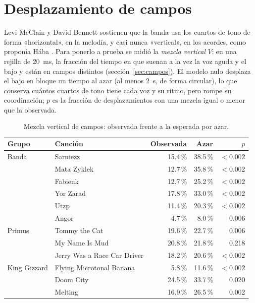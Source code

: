 \section{Desplazamiento de campos}\label{sec:res-haba}

Levi McClain y David Bennett sostienen que la banda usa los cuartos de tono de forma «horizontal», en la melodía, y casi
nunca «vertical», en los acordes, como proponía Hába \citep{mcclain2026,bennett2026}. Para ponerlo a prueba se midió la
\emph{mezcla vertical} $V$: en una rejilla de 20~ms, la fracción del tiempo en que suenan a la vez la voz aguda y el bajo
y están en campos distintos (sección~\ref{sec:campos}). El modelo nulo desplaza el bajo en bloque un tiempo al azar (al
menos 2~s, de forma circular), lo que conserva cuántos cuartos de tono tiene cada voz y su ritmo, pero rompe su
coordinación; $p$ es la fracción de desplazamientos con una mezcla igual o menor que la observada.

\begin{table}[ht]
  \centering
  \caption{Mezcla vertical de campos: observada frente a la esperada por azar.}\label{tab:haba}
  \begin{tabular}{@{}llrrr@{}}
    \toprule
    Grupo & Canción & Observada & Azar & $p$ \\
    \midrule
    Banda & Sarniezz & 15.4\,\% & 38.5\,\% & $< 0.002$ \\
    & Mata Zyklek & 12.7\,\% & 35.8\,\% & $< 0.002$ \\
    & Fabienk & 12.7\,\% & 25.2\,\% & $< 0.002$ \\
    & Yor Zarad & 17.8\,\% & 33.0\,\% & $< 0.002$ \\
    & Utzp & 11.4\,\% & 20.3\,\% & $< 0.002$ \\
    & Angor & 4.7\,\% & 8.0\,\% & 0.006 \\
    \midrule
    Primus & Tommy the Cat & 19.6\,\% & 22.7\,\% & 0.006 \\
    & My Name Is Mud & 20.8\,\% & 21.8\,\% & 0.218 \\
    & Jerry Was a Race Car Driver & 18.2\,\% & 20.6\,\% & $< 0.002$ \\
    \midrule
    King Gizzard & Flying Microtonal Banana & 5.8\,\% & 11.6\,\% & $< 0.002$ \\
    & Doom City & 24.5\,\% & 33.7\,\% & 0.020 \\
    & Melting & 16.9\,\% & 26.5\,\% & 0.002 \\
    \bottomrule
  \end{tabular}
\end{table}

